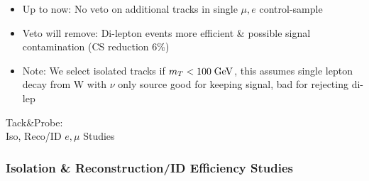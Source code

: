 \documentclass{beamer}
\begin{document}
\begin{frame}
 \begin{itemize}
  \item Up to now: No veto on additional tracks in single $\mu,e$ control-sample
  \item Veto will remove: Di-lepton events more efficient \& possible signal contamination (CS reduction 6\%)
   \item Note: We select isolated tracks if $m_{T}<100\;\text{Ge}\kern-0.06667em\text{V}$, this assumes single lepton decay from W with $\nu$ only \met source good for keeping signal, bad for rejecting di-lep \ttbar
 \end{itemize}

\end{frame}






\begin{frame}
 \begin{block}{}
 \centering
 \Large Tack\&Probe:\\Iso, Reco/ID $e,\mu$ Studies
 \end{block}
\end{frame}

\begin{frame}
\frametitle{Isolation \& Reconstruction/ID Efficiency Studies}
 \begin{center}
 \end{center}
\end{frame}
\end{document}
